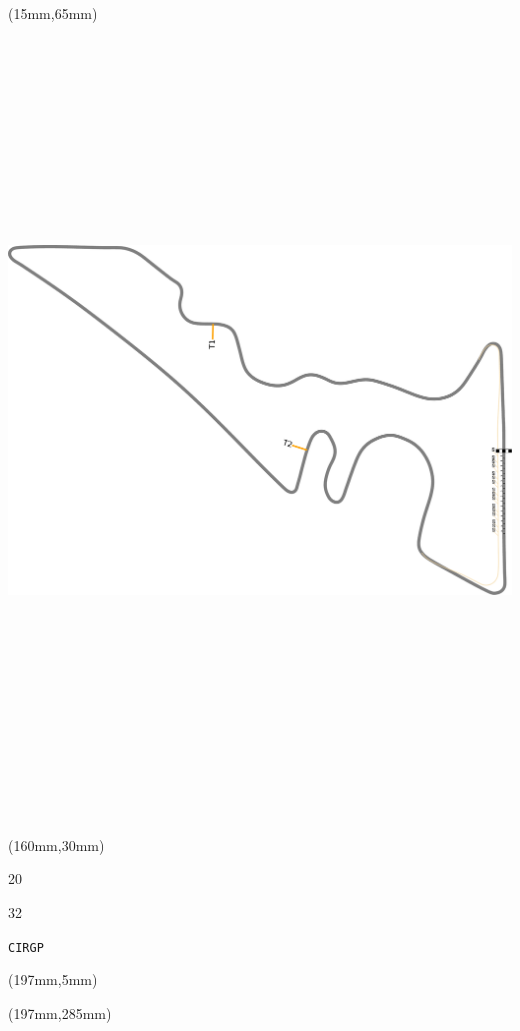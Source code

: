 \begin{textblock*}{185mm}(15mm,65mm)%
\centering
\mbox{\includegraphics[width=185mm,height=210mm,keepaspectratio]{PT/CIRGP.pdf}}
\end{textblock*}
\begin{textblock*}{40mm}(160mm,30mm)%
\Large
\par{} 
\par20 
\par32 
\par\hfill\tiny\tt CIRGP\\
\end{textblock*}
\begin{textblock*}{20mm}(197mm,5mm)%
\fbox{\thepage}
\label{CIRGP}
\end{textblock*}
\begin{textblock*}{20mm}(197mm,285mm)%
\fbox{\thepage}
\end{textblock*}

